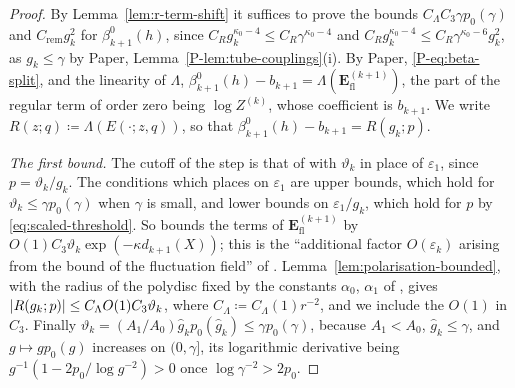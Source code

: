 \documentclass[11pt]{preprint}
\DeclarePairedDelimiter{\abs}{\lvert}{\rvert}
\numberwithin{equation}{section}
\theoremstyle{definition}
\theoremstyle{remark}
\theoremstyle{plain}
\begin{document}
\begin{proof}
By Lemma~\ref{lem:r-term-shift} it suffices to prove the bounds $C_\Lambda C_3\gamma p_0(\gamma)$ and $C_{\mathrm{rem}}g_k^2$ for $\beta^0_{k+1}(h)$, since $C_Rg_k^{\kappa_0-4} \leq C_R\gamma^{\kappa_0-4}$ and $C_Rg_k^{\kappa_0-4} \leq C_R\gamma^{\kappa_0-6}g_k^2$, as $g_k \leq \gamma$ by Paper, Lemma~\ref{P-lem:tube-couplings}(i). By Paper, \eqref{P-eq:beta-split}, and the linearity of $\Lambda$, $\beta^0_{k+1}(h) - b_{k+1} = \Lambda(\mathbf E^{(k+1)}_{\mathrm{fl}})$, the part of the regular term of order zero being $\log Z^{(k)}$, whose coefficient is $b_{k+1}$. We write $R(z; q) \coloneqq \Lambda(E(\cdot; z, q))$, so that $\beta^0_{k+1}(h) - b_{k+1} = R(g_k; p)$.

\emph{The first bound.} The cutoff of the step is that of \cite[Sect.~2]{BalabanRG2} with $\vartheta_k$ in place of $\varepsilon_1$, since $p = \vartheta_k/g_k$. The conditions which \cite{BalabanRG2} places on $\varepsilon_1$ are upper bounds, which hold for $\vartheta_k \leq \gamma p_0(\gamma)$ when $\gamma$ is small, and lower bounds on $\varepsilon_1/g_k$, which hold for $p$ by \eqref{eq:scaled-threshold}. So \cite[(2.41), p.~21]{BalabanRG2} bounds the terms of $\mathbf E^{(k+1)}_{\mathrm{fl}}$ by $O(1)C_3\vartheta_k\exp(-\kappa d_{k+1}(X))$; this is the ``additional factor $O(\varepsilon_k)$ arising from the bound of the fluctuation field'' of \cite[p.~277]{BalabanCRE}. Lemma~\ref{lem:polarisation-bounded}, with the radius of the polydisc fixed by the constants $\alpha_0$, $\alpha_1$ of \cite[(1.10)--(1.16), p.~262]{BalabanRG1}, gives $\abs{R(g_k; p)} \leq C_\Lambda O(1)C_3\vartheta_k$, where $C_\Lambda \coloneqq C_\Lambda(1)r^{-2}$, and we include the $O(1)$ in $C_3$. Finally $\vartheta_k = (A_1/A_0)\hat g_kp_0(\hat g_k) \leq \gamma p_0(\gamma)$, because $A_1 < A_0$, $\hat g_k \leq \gamma$, and $g \mapsto gp_0(g)$ increases on $(0, \gamma]$, its logarithmic derivative being $g^{-1}(1 - 2p_0/\log g^{-2}) > 0$ once $\log\gamma^{-2} > 2p_0$.


\end{proof}
\end{document}
